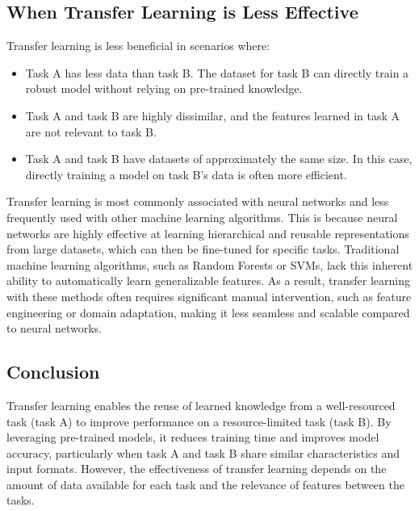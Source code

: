\documentclass[12pt,openany]{book}
\begin{document}
\subsection{When Transfer Learning is Less Effective}

Transfer learning is less beneficial in scenarios where:
\begin{itemize}
    \item Task A has less data than task B. The dataset for task B can directly train a robust model without relying on pre-trained knowledge.
    \item Task A and task B are highly dissimilar, and the features learned in task A are not relevant to task B.
    \item Task A and task B have datasets of approximately the same size. In this case, directly training a model on task B’s data is often more efficient.
\end{itemize}

\vspace{0.5cm}

\begin{notebox}
Transfer learning is most commonly associated with neural networks and less frequently used with other machine learning algorithms. This is because neural networks are highly effective at learning hierarchical and reusable representations from large datasets, which can then be fine-tuned for specific tasks. Traditional machine learning algorithms, such as Random Forests or SVMs, lack this inherent ability to automatically learn generalizable features. As a result, transfer learning with these methods often requires significant manual intervention, such as feature engineering or domain adaptation, making it less seamless and scalable compared to neural networks.
\end{notebox}

\subsection{Conclusion}

Transfer learning enables the reuse of learned knowledge from a well-resourced task (task A) to improve performance on a resource-limited task (task B). By leveraging pre-trained models, it reduces training time and improves model accuracy, particularly when task A and task B share similar characteristics and input formats. However, the effectiveness of transfer learning depends on the amount of data available for each task and the relevance of features between the tasks. \
\end{document}
